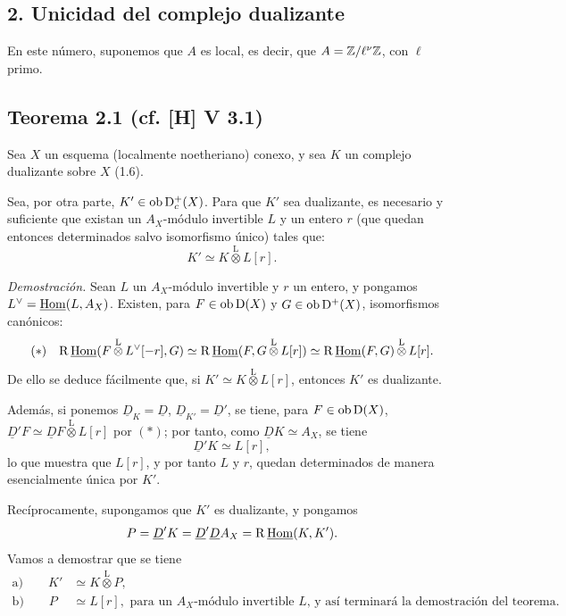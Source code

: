 \subsection*{2. Unicidad del complejo dualizante}

En este número, suponemos que $A$ es local, es decir, que $A = \mathbb{Z}/\ell^{\nu}\mathbb{Z}$, con $\ell$ primo.

\subsection*{Teorema 2.1 (cf. [H] V 3.1)}
Sea $X$ un esquema (localmente noetheriano) conexo, y sea $K$ un complejo dualizante sobre $X$ (1.6).

Sea, por otra parte, $K' \in \operatorname{ob} \mathrm{D}_c^{+}(X)$. Para que $K'$ sea dualizante, es necesario y suficiente que existan un $A_X$-módulo invertible $L$ y un entero $r$ (que quedan entonces determinados salvo isomorfismo único) tales que:
\[
K' \simeq K \mathop{\otimes}\limits^{\mathrm{L}} L[r].
\]

\emph{Demostración.} Sean $L$ un $A_X$-módulo invertible y $r$ un entero, y pongamos $L^{\vee} = \underline{\operatorname{Hom}}(L, A_X)$. Existen, para $F \in \operatorname{ob} \mathrm{D}(X)$ y $G \in \operatorname{ob} \mathrm{D}^{+}(X)$, isomorfismos canónicos:
\[
(*) \quad \mathrm{R}\,\underline{\operatorname{Hom}}(F \mathop{\otimes}\limits^{\mathrm{L}} L^{\vee}[-r], G) \simeq \mathrm{R}\,\underline{\operatorname{Hom}}(F, G \mathop{\otimes}\limits^{\mathrm{L}} L[r]) \simeq \mathrm{R}\,\underline{\operatorname{Hom}}(F,G) \mathop{\otimes}\limits^{\mathrm{L}} L[r].
\]
De ello se deduce fácilmente que, si $K' \simeq K \mathop{\otimes}\limits^{\mathrm{L}} L[r]$, entonces $K'$ es dualizante.

Además, si ponemos $\underline{D}_K = \underline{D}$, $\underline{D}_{K'} = \underline{D}'$, se tiene, para $F \in \operatorname{ob} \mathrm{D}(X)$, $\underline{D}'F \simeq \underline{D} F \mathop{\otimes}\limits^{\mathrm{L}} L[r]$ por $(*)$; por tanto, como $\underline{D} K \simeq A_X$, se tiene
\[
\underline{D}' K \simeq L[r],
\]
lo que muestra que $L[r]$, y por tanto $L$ y $r$, quedan determinados de manera esencialmente única por $K'$.

Recíprocamente, supongamos que $K'$ es dualizante, y pongamos
\[
P = \underline{D}'K = \underline{D}'\underline{D} A_X = \mathrm{R}\,\underline{\operatorname{Hom}}(K,K').
\]
Vamos a demostrar que se tiene
\begin{align*}
\text{a)} \qquad K' &\simeq K \mathop{\otimes}\limits^{\mathrm{L}} P, \\
\text{b)} \qquad P &\simeq L[r], \text{ para un $A_X$-módulo invertible $L$, y así terminará la demostración del teorema.}
\end{align*}

